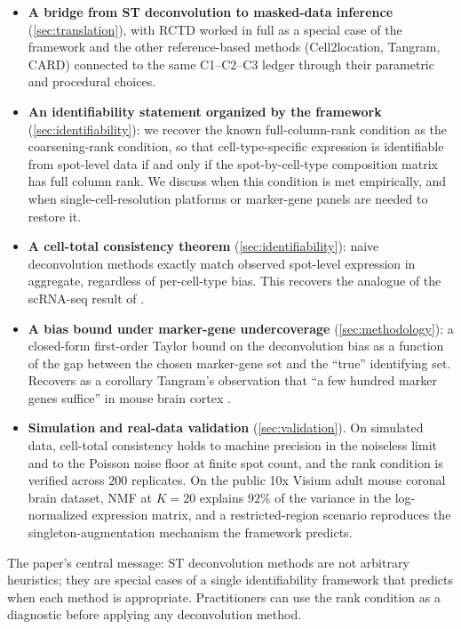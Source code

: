 \begin{itemize}
\item \textbf{A bridge from ST deconvolution to masked-data
  inference} (\cref{sec:translation}), with RCTD worked in full as a
  special case of the framework and the other reference-based methods
  (Cell2location, Tangram, CARD) connected to the same C1--C2--C3 ledger
  through their parametric and procedural choices.

\item \textbf{An identifiability statement organized by the
  framework} (\cref{sec:identifiability}): we recover the known
  full-column-rank condition \citep{cai2024inference,fu2019nmf} as the
  coarsening-rank condition, so that cell-type-specific expression is
  identifiable from spot-level data if and only if the
  spot-by-cell-type composition matrix has full column rank. We
  discuss when this condition is met empirically, and when
  single-cell-resolution platforms or marker-gene panels are needed to
  restore it.

\item \textbf{A cell-total consistency theorem}
  (\cref{sec:identifiability}): naive deconvolution methods exactly
  match observed spot-level expression in aggregate, regardless of
  per-cell-type bias. This recovers the analogue of the scRNA-seq
  result of \citet{towell2026scrnacoarsening}.

\item \textbf{A bias bound under marker-gene undercoverage}
  (\cref{sec:methodology}): a closed-form first-order Taylor bound on
  the deconvolution bias as a function of the gap between the chosen
  marker-gene set and the ``true'' identifying set. Recovers as a
  corollary Tangram's observation that ``a few hundred marker genes
  suffice'' in mouse brain cortex \citep{biancalani2021deep}.

\item \textbf{Simulation and real-data validation}
  (\cref{sec:validation}). On simulated data, cell-total consistency
  holds to machine precision in the noiseless limit and to the
  Poisson noise floor at finite spot count, and the rank condition is
  verified across $200$ replicates. On the public 10x Visium adult
  mouse coronal brain dataset, NMF at $K = 20$ explains $92\%$ of
  the variance in the log-normalized expression matrix, and a
  restricted-region scenario reproduces the singleton-augmentation
  mechanism the framework predicts.
\end{itemize}

The paper's central message: ST deconvolution methods are not
arbitrary heuristics; they are special cases of a single
identifiability framework that predicts when each method is
appropriate. Practitioners can use the rank condition as a diagnostic
before applying any deconvolution method.
